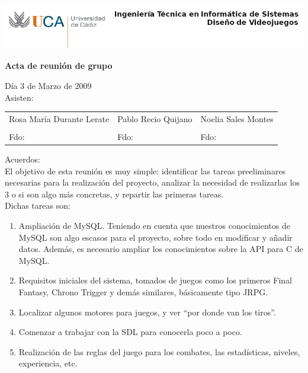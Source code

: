\documentclass[a4paper,10pt]{article}
\begin{document}
\includegraphics[scale=0.6]{../uca.png}

\begin{center}
  \noindent \huge\textbf{ Acta de reunión de grupo}\\
\end{center}

\noindent Día 3 de Marzo de 2009\\

\noindent Asisten:

\begin{center}
\begin{tabular}{|m{5.2cm}|m{5.2cm}|m{5.2cm}|}
  \hline
  Rosa María Durante Lerate & Pablo Recio Quijano & Noelia Sales Montes\\
  & & \\[2cm]
  Fdo: & Fdo: & Fdo: \\
  \hline
\end{tabular}
\end{center}

\noindent Acuerdos:\\

\noindent El objetivo de esta reunión es muy simple: identificar las
tareas preeliminares necesarias para la realización del proyecto,
analizar la necesidad de realizarlas los 3 o si son algo más concretas,
y repartir las primeras tareas.\\

\noindent Dichas tareas son:

\begin{enumerate}
\item Ampliación de MySQL. Teniendo en cuenta que nuestros
  conocimientos de MySQL son algo escasos para el proyecto, sobre todo
  en modificar y añadir datos. Además, es necesario ampliar los
  conocimientos sobre la API para C de MySQL.
\item Requisitos iniciales del sistema, tomados de juegos como los
  primeros Final Fantasy, Chrono Trigger y demás similares,
  básicamente tipo JRPG.
\item Localizar algunos motores para juegos, y ver ``por donde van los
  tiros''.
\item Comenzar a trabajar con la SDL para conocerla poco a poco.
\item Realización de las reglas del juego para los combates, las
  estadísticas, niveles, experiencia, etc.
\end{enumerate}
\end{document}
